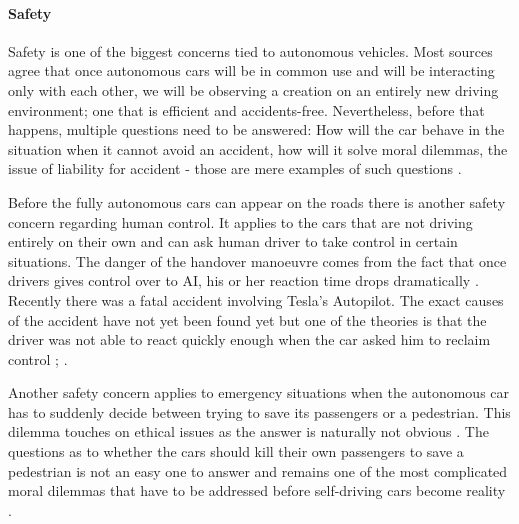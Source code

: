 \documentclass[11pt,english]{article}
\begin{document}




\paragraph{Safety}

Safety is one of the biggest concerns tied to autonomous vehicles. Most sources agree that once autonomous cars will be in common use and will be interacting only with each other, we will be observing a creation on an entirely new driving environment; one that is efficient and accidents-free. Nevertheless, before that happens, multiple questions need to be answered: How will the car behave in the situation when it cannot avoid an accident, how will it solve moral dilemmas, the issue of liability for accident  - those are mere examples of such questions \citep{techtimes}. 
 


\par
Before the fully autonomous cars can appear on the roads there is another safety concern regarding human control. It applies to the cars that are not driving entirely on their own and can ask human driver to take control in certain situations. The danger of the handover manoeuvre comes from the fact that once drivers gives control over to AI, his or her reaction time drops dramatically \citep{merat2009drivers}. Recently there was a fatal accident involving Tesla's Autopilot. The exact causes of the accident have not yet been found yet but one of the theories is that the driver was not able to react quickly enough when the car asked him to reclaim control \citep{teslacrash}; \citep{tesla4}. 

\par
Another safety concern applies to emergency situations when the autonomous car has to suddenly decide between trying to save its passengers or a pedestrian. This dilemma touches on ethical issues as the answer is naturally not obvious \citep{qz}. The questions as to whether the cars should kill their own passengers to save a pedestrian is not an easy one to answer and remains one of the most complicated moral dilemmas that have to be addressed before self-driving cars become reality \citep{bonnefon2015autonomous}.
\end{document}
